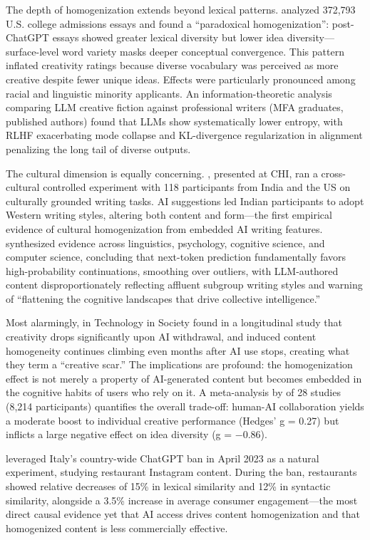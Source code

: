 \documentclass[12pt,a4paper]{article}
\begin{document}
The depth of homogenization extends beyond lexical patterns. \citet{alvero2025} analyzed 372,793 U.S. college admissions essays and found a ``paradoxical homogenization'': post-ChatGPT essays showed greater lexical diversity but lower idea diversity---surface-level word variety masks deeper conceptual convergence. This pattern inflated creativity ratings because diverse vocabulary was perceived as more creative despite fewer unique ideas. Effects were particularly pronounced among racial and linguistic minority applicants. An information-theoretic analysis \citep{sui2026} comparing LLM creative fiction against professional writers (MFA graduates, published authors) found that LLMs show systematically lower entropy, with RLHF exacerbating mode collapse and KL-divergence regularization in alignment penalizing the long tail of diverse outputs.

The cultural dimension is equally concerning. \citet{agarwal2025}, presented at CHI, ran a cross-cultural controlled experiment with 118 participants from India and the US on culturally grounded writing tasks. AI suggestions led Indian participants to adopt Western writing styles, altering both content and form---the first empirical evidence of cultural homogenization from embedded AI writing features. \citet{sourati2025} synthesized evidence across linguistics, psychology, cognitive science, and computer science, concluding that next-token prediction fundamentally favors high-probability continuations, smoothing over outliers, with LLM-authored content disproportionately reflecting affluent subgroup writing styles and warning of ``flattening the cognitive landscapes that drive collective intelligence.''

Most alarmingly, \citet{zhou2026scar} in Technology in Society found in a longitudinal study that creativity drops significantly upon AI withdrawal, and induced content homogeneity continues climbing even months after AI use stops, creating what they term a ``creative scar.'' The implications are profound: the homogenization effect is not merely a property of AI-generated content but becomes embedded in the cognitive habits of users who rely on it. A meta-analysis by \citet{holzner2025} of 28 studies (8,214 participants) quantifies the overall trade-off: human-AI collaboration yields a moderate boost to individual creative performance (Hedges' g = 0.27) but inflicts a large negative effect on idea diversity (g = $-$0.86).

\citet{liu2025italy} leveraged Italy's country-wide ChatGPT ban in April 2023 as a natural experiment, studying restaurant Instagram content. During the ban, restaurants showed relative decreases of 15\% in lexical similarity and 12\% in syntactic similarity, alongside a 3.5\% increase in average consumer engagement---the most direct causal evidence yet that AI access drives content homogenization and that homogenized content is less commercially effective.
\end{document}
